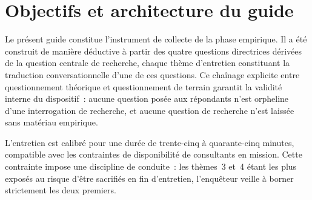 
\section{Objectifs et architecture du guide}

Le présent guide constitue l'instrument de collecte de la phase empirique. Il a été
construit de manière déductive à partir des quatre questions directrices dérivées de
la question centrale de recherche, chaque thème d'entretien constituant la
traduction conversationnelle d'une de ces questions. Ce chaînage explicite entre
questionnement théorique et questionnement de terrain garantit la validité interne
du dispositif~: aucune question posée aux répondants n'est orpheline d'une
interrogation de recherche, et aucune question de recherche n'est laissée sans
matériau empirique.

L'entretien est calibré pour une durée de trente-cinq à quarante-cinq minutes,
compatible avec les contraintes de disponibilité de consultants en mission. Cette
contrainte impose une discipline de conduite~: les thèmes~3 et~4 étant les plus
exposés au risque d'être sacrifiés en fin d'entretien, l'enquêteur veille à borner
strictement les deux premiers.

